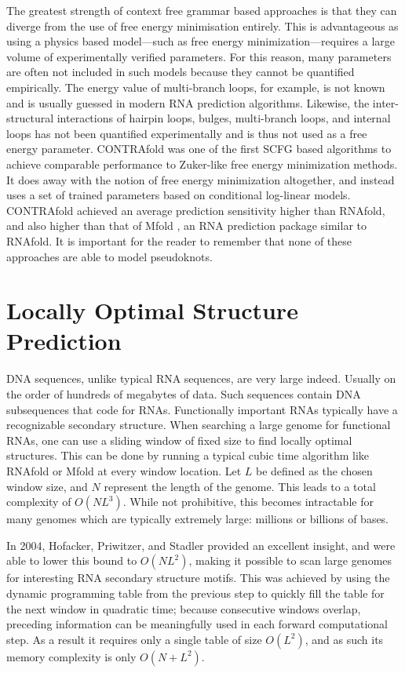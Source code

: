 \documentclass{cshonours}
\begin{document}
The greatest strength of context free grammar based approaches is that they
can diverge from the use of free energy minimisation entirely. This is advantageous as using
a physics based model---such as free energy minimization---requires a large volume
of experimentally verified parameters. For this reason, many parameters are often not included in such models because they cannot be quantified empirically.
The energy value of multi-branch loops, for example, is not known and is usually
guessed in modern RNA prediction algorithms. Likewise, the inter-structural
interactions of hairpin loops, bulges, multi-branch loops, and internal loops has
not been quantified experimentally and is thus not used as a free energy parameter. CONTRAfold \cite{do2006contrafold} was one of the first SCFG based algorithms to achieve
comparable performance to Zuker-like free energy minimization methods. It does
away with the notion of free energy minimization altogether, and instead uses a
set of trained parameters based on conditional log-linear models. CONTRAfold
achieved an average prediction sensitivity higher than RNAfold, and also higher
than that of Mfold \cite{zuker2003mfold}, an RNA prediction package similar to RNAfold. It
is important for the reader to remember that none of these approaches are able to
model pseudoknots.

\section{Locally Optimal Structure Prediction}
DNA sequences, unlike typical RNA sequences, are very large indeed. Usually
on the order of hundreds of megabytes of data. Such sequences contain DNA
subsequences that code for RNAs. Functionally important RNAs typically have
a recognizable secondary structure. When searching a large genome for functional RNAs, one can use a sliding window of fixed size to find locally optimal
structures. This can be done by running a typical cubic time algorithm like
RNAfold or Mfold at every window location. Let $L$ be defined as the chosen
window size, and $N$ represent the length of the genome. This leads to a total complexity of $O(NL^3)$. While not prohibitive, this becomes intractable for many
genomes which are typically extremely large: millions or billions of bases. 

In 2004, Hofacker, Priwitzer, and Stadler \cite{hofacker2004prediction} provided an excellent insight, and were
able to lower this bound to $O(NL^2)$, making it possible to scan large genomes
for interesting RNA secondary structure motifs. This was achieved by using the
dynamic programming table from the previous step to quickly fill the table for
the next window in quadratic time; because consecutive windows overlap, preceding information can be meaningfully used in each forward computational step.
As a result it requires only a single table of size $O(L^2)$, and as such its memory complexity is only $O(N + L^2)$.
\end{document}
